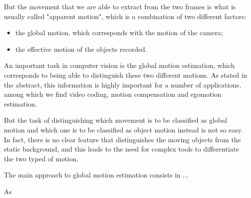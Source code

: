 But the movement that we are able to extract from the two frames is what is usually called "apparent motion", which is a combination of two different factors:
\begin{itemize}[noitemsep]
    \item the global motion, which corresponds with the motion of the camera;
    \item the effective motion of the objects recorded.
\end{itemize}

An important task in computer vision is the global motion estimation, which corresponds to being able to distinguish these two different motions.
As stated in the abstract, this information is highly important for a number of applications, among which we find video coding, motion compensation and egomotion estimation.

But the task of distinguishing which movement is to be classified as global motion and which one is to be classified as object motion instead is not so easy. In fact, there is no clear feature that distinguishes the moving objects from the static background, and this leads to the need for complex tools to differentiate the two typed of motion.

The main approach to global motion estimation consists in ...


As \cite{Dufeaux2000}